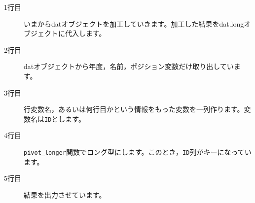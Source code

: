 \begin{description}
	\item[1行目] いまからdatオブジェクトを加工していきます。加工した結果をdat.longオブジェクトに代入します。
	\item[2行目] datオブジェクトから年度，名前，ポジション変数だけ取り出しています。
	\item[3行目] 行変数名，あるいは何行目かという情報をもった変数を一列作ります。変数名は\verb|ID|とします。
	\item[4行目] \verb|pivot_longer|関数でロング型にします。このとき，\verb|ID|列がキーになっています。
	\item[5行目] 結果を出力させています。
\end{description}
